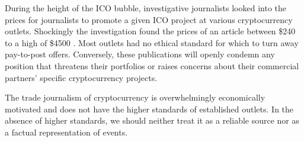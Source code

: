 During the height of the ICO bubble, investigative journalists looked into the
prices for journalists to promote a given ICO project at various cryptocurrency
outlets. Shockingly the investigation found the prices of an article between
\$240 to a high of \$4500 \cite{faife_we_2018}. Most outlets had no ethical
standard for which to turn away pay-to-post offers. Conversely, these
publications will openly condemn any position that threatens their portfolios or
raises concerns about their commercial partners' specific cryptocurrency
projects.


The trade journalism of cryptocurrency is overwhelmingly economically motivated
and does not have the higher standards of established outlets. In the absence of
higher standards, we should neither treat it as a reliable source nor as a
factual representation of events.
